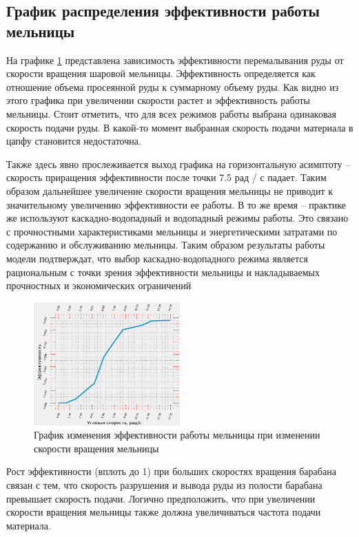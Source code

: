 \documentclass[utf8x, 14pt, oneside, a4paper]{article}
\begin{document}
\subsection{График распределения эффективности работы мельницы}

На графике \ref{pic:efficiency} представлена зависимость эффективности перемалывания руды от скорости вращения шаровой мельницы. 
Эффективность определяется как отношение объема просеянной руды к суммарному объему руды.
Как видно из этого графика при увеличении скорости растет и эффективность работы мельницы.
Стоит отметить, что для всех режимов работы выбрана одинаковая скорость подачи руды.
В какой-то момент выбранная скорость подачи материала в цапфу становится недостаточна.

Также здесь явно прослеживается выход графика на горизонтальную асимптоту -- скорость приращения эффективности после точки 7.5 рад / с падает. 
Таким образом дальнейшее увеличение скорости вращения мельницы не приводит к значительному увеличению эффективности ее работы. В то же время -- практике же используют каскадно-водопадный и водопадный режимы работы.
Это связано с прочностными характеристиками мельницы и энергетическими затратами по содержанию и обслуживанию мельницы.
Таким образом результаты работы модели подтверждат, что выбор каскадно-водопадного режима является рациональным с точки зрения эффективности мельницы и накладываемых прочностных и экономических ограничений

\begin{figure}[H]
	\centering
	\includegraphics[width=0.5\textwidth]{efficiency} 
	\caption{График изменения эффективности работы мельницы при изменении скорости вращения мельницы}
	\label{pic:efficiency}
\end{figure} 

Рост эффективности (вплоть до 1) при больших скоростях вращения барабана связан с тем, что скорость разрушения и вывода руды из полости барабана превышает скорость подачи.
Логично предположить, что при увеличении скорости вращения мельницы также должна увеличиваться частота подачи материала.
\end{document}
